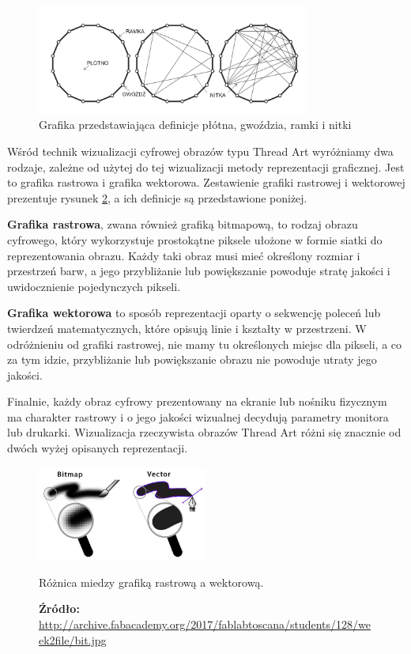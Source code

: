     \begin{figure}[H]
        \centering
        \includegraphics[width=0.8\textwidth]{img/2-theory/cztery-pojecia.png}
        \caption[Grafika przedstawiająca płótno, gwoździe, ramkę i nitki]{Grafika przedstawiająca definicje płótna, gwoździa, ramki i nitki}
        \label{theory-basic-definitions-vis}
    \end{figure}
    
    
    Wśród technik wizualizacji cyfrowej obrazów typu Thread Art wyróżniamy dwa rodzaje, zależne od użytej do tej wizualizacji metody reprezentacji graficznej. Jest to grafika rastrowa i grafika wektorowa. Zestawienie grafiki rastrowej i wektorowej prezentuje rysunek \ref{theory-raster-vs-vector}, a ich definicje są przedstawione poniżej. 
   
    \textbf{Grafika rastrowa}, zwana również grafiką bitmapową, to rodzaj obrazu cyfrowego, który wykorzystuje prostokątne piksele ułożone w formie siatki do reprezentowania obrazu. Każdy taki obraz musi mieć określony rozmiar i przestrzeń barw, a jego przybliżanie lub powiększanie powoduje stratę jakości i uwidocznienie pojedynczych pikseli. 
    
    \textbf{Grafika wektorowa} to sposób reprezentacji oparty o sekwencję poleceń lub twierdzeń matematycznych, które opisują linie i kształty w przestrzeni. W odróżnieniu od grafiki rastrowej, nie mamy tu określonych miejsc dla pikseli, a co za tym idzie, przybliżanie lub powiększanie obrazu nie powoduje utraty jego jakości.
    
    Finalnie, każdy obraz cyfrowy prezentowany na ekranie lub nośniku fizycznym ma charakter rastrowy i o jego jakości wizualnej decydują parametry monitora lub drukarki. Wizualizacja rzeczywista obrazów Thread Art różni się znacznie od dwóch wyżej opisanych reprezentacji.
    
    \begin{figure}[H]
        \centering
        \includegraphics[width=0.5\textwidth,keepaspectratio]{img/2-theory/raster-vs-vector.jpg}
        \caption[Różnica miedzy grafiką rastrową a wektorową]{Różnica miedzy grafiką rastrową a wektorową.}
        \caption*{\footnotesize{\textbf{Źródło:} {\url{http://archive.fabacademy.org/2017/fablabtoscana/students/128/week2file/bit.jpg}}}}
        \label{theory-raster-vs-vector}
    \end{figure}
    
